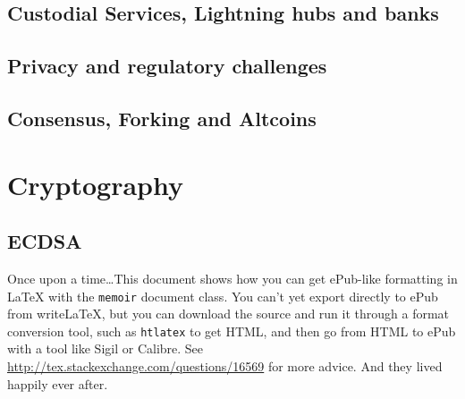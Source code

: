 \documentclass[ebook,12pt,oneside,openany]{memoir}
\begin{document}
\section{Custodial Services, Lightning hubs and banks}
\section{Privacy and regulatory challenges}
\section{Consensus, Forking and Altcoins}

\appendix
\chapter{Cryptography}
\section{ECDSA}

Once upon a time\ldots This document shows how you can get ePub-like formatting in \LaTeX{} with the \verb|memoir| document class. You can't yet export directly to ePub from writeLaTeX, but you can download the source and run it through a format conversion tool, such as \verb|htlatex| to get HTML, and then go from HTML to ePub with a tool like Sigil or Calibre. See \url{http://tex.stackexchange.com/questions/16569} for more advice. And they lived happily ever after.
\end{document}

